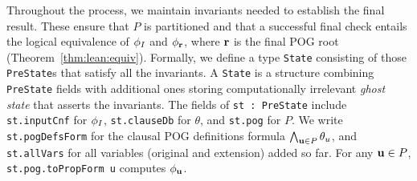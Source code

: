 Throughout the process,
we maintain invariants needed to establish the final result.
These ensure that $P$ is partitioned
and that a successful final check entails the logical equivalence
of $\phi_I$ and $\phi_{\mathbf{r}}$,
where $\mathbf{r}$ is the final POG root (Theorem~\ref{thm:lean:equiv}).
Formally, we define a type {\tt State}
consisting of those {\tt PreState}s
that satisfy all the invariants.
A {\tt State} is a structure
combining {\tt PreState} fields with additional ones
storing computationally irrelevant \emph{ghost state}
that asserts the invariants.
The fields of \lstinline{st : PreState} include
\lstinline{st.inputCnf} for $\phi_I$,
\lstinline{st.clauseDb} for $\theta$,
and \lstinline{st.pog} for $P$.
We write \lstinline{st.pogDefsForm} for the clausal POG definitions formula $\bigwedge_{\mathbf{u}\in P}\theta_u$,
and \lstinline{st.allVars} for all variables (original and extension) added so far.
For any $\mathbf{u}\in P$,
\lstinline{st.pog.toPropForm u} computes $\phi_{\mathbf{u}}$.


